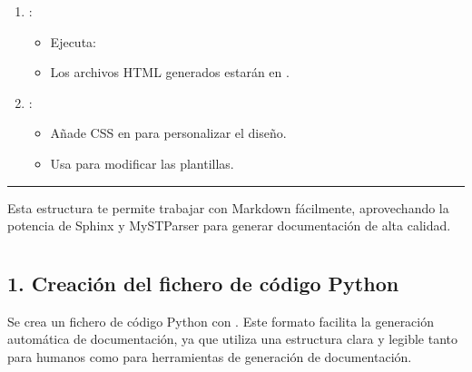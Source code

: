 \documentclass[a4paper,10pt,spanish]{sphinxmanual}
\begin{document}
\begin{enumerate}
\item {} 
\sphinxAtStartPar
{}:
\begin{itemize}
\item {} 
\sphinxAtStartPar
Ejecuta:

\sphinxAtStartPar
{}

\item {} 
\sphinxAtStartPar
Los archivos HTML generados estarán en .

\end{itemize}

\item {} 
\sphinxAtStartPar
{}:
\begin{itemize}
\item {} 
\sphinxAtStartPar
Añade CSS en  para personalizar el diseño.

\item {} 
\sphinxAtStartPar
Usa  para modificar las plantillas.

\end{itemize}

\end{enumerate}


\bigskip\hrule\bigskip


\sphinxAtStartPar
Esta estructura te permite trabajar con Markdown fácilmente, aprovechando la potencia de Sphinx y MyST\sphinxhyphen{}Parser para generar documentación de alta calidad.

\sphinxstepscope

\sphinxstepscope

\sphinxstepscope


\section{}
\label{\detokenize{configuracion_inicial/007.Creacion_de_ficheros_de_codigo_y_generacion_automatica_de_documentacion:creacion-de-ficheros-de-codigo-y-generacion-automatica-de-documentacion}}\label{\detokenize{configuracion_inicial/007.Creacion_de_ficheros_de_codigo_y_generacion_automatica_de_documentacion::doc}}

\subsection{1. Creación del fichero de código Python}
\label{\detokenize{configuracion_inicial/007.Creacion_de_ficheros_de_codigo_y_generacion_automatica_de_documentacion:creacion-del-fichero-de-codigo-python}}
\sphinxAtStartPar
Se crea un fichero de código Python con . Este formato facilita la generación automática de documentación, ya que utiliza una estructura clara y legible tanto para humanos como para herramientas de generación de documentación.
\end{document}
